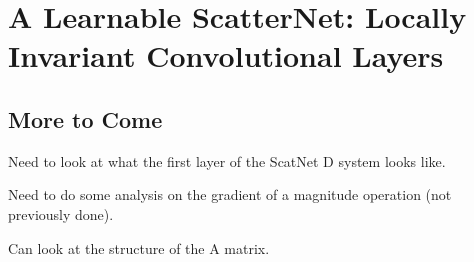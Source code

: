 \chapter{A Learnable ScatterNet: Locally Invariant Convolutional Layers}

\def \path {invariantlayer/}
\def \imgpath {invariantlayer/images}









\section{More to Come}
Need to look at what the first layer of the ScatNet D system looks like.

Need to do some analysis on the gradient of a magnitude operation (not
previously done).

Can look at the structure of the A matrix.

